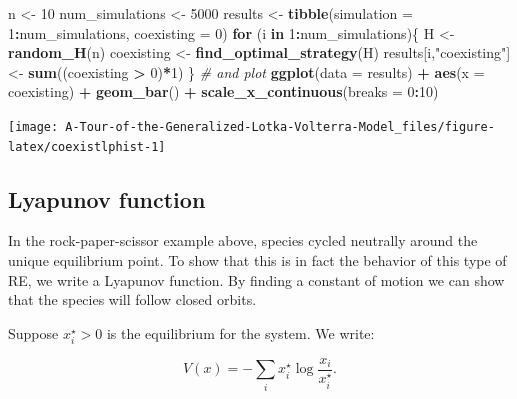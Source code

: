 \documentclass[
]{book}
\newenvironment{Shaded}{\begin{snugshade}}{\end{snugshade}}
\newcommand{\CommentTok}[1]{\textcolor[rgb]{0.56,0.35,0.01}{\textit{#1}}}
\newcommand{\ControlFlowTok}[1]{\textcolor[rgb]{0.13,0.29,0.53}{\textbf{#1}}}
\newcommand{\DataTypeTok}[1]{\textcolor[rgb]{0.13,0.29,0.53}{#1}}
\newcommand{\DecValTok}[1]{\textcolor[rgb]{0.00,0.00,0.81}{#1}}
\newcommand{\KeywordTok}[1]{\textcolor[rgb]{0.13,0.29,0.53}{\textbf{#1}}}
\newcommand{\NormalTok}[1]{#1}
\newcommand{\OperatorTok}[1]{\textcolor[rgb]{0.81,0.36,0.00}{\textbf{#1}}}
\newcommand{\StringTok}[1]{\textcolor[rgb]{0.31,0.60,0.02}{#1}}
\begin{document}
\begin{Shaded}
\begin{Highlighting}[]
\NormalTok{n <-}\StringTok{ }\DecValTok{10}
\NormalTok{num_simulations <-}\StringTok{ }\DecValTok{5000}
\NormalTok{results <-}\StringTok{ }\KeywordTok{tibble}\NormalTok{(}\DataTypeTok{simulation =} \DecValTok{1}\OperatorTok{:}\NormalTok{num_simulations, }\DataTypeTok{coexisting =} \DecValTok{0}\NormalTok{)}
\ControlFlowTok{for}\NormalTok{ (i }\ControlFlowTok{in} \DecValTok{1}\OperatorTok{:}\NormalTok{num_simulations)\{}
\NormalTok{  H <-}\StringTok{ }\KeywordTok{random_H}\NormalTok{(n)}
\NormalTok{  coexisting <-}\StringTok{ }\KeywordTok{find_optimal_strategy}\NormalTok{(H)}
\NormalTok{  results[i,}\StringTok{"coexisting"}\NormalTok{] <-}\StringTok{ }\KeywordTok{sum}\NormalTok{((coexisting }\OperatorTok{>}\StringTok{ }\DecValTok{0}\NormalTok{)}\OperatorTok{*}\DecValTok{1}\NormalTok{)}
\NormalTok{\}}
\CommentTok{# and plot}
\KeywordTok{ggplot}\NormalTok{(}\DataTypeTok{data =}\NormalTok{ results) }\OperatorTok{+}\StringTok{ }
\StringTok{  }\KeywordTok{aes}\NormalTok{(}\DataTypeTok{x =}\NormalTok{ coexisting) }\OperatorTok{+}\StringTok{ }
\StringTok{  }\KeywordTok{geom_bar}\NormalTok{() }\OperatorTok{+}\StringTok{ }
\StringTok{  }\KeywordTok{scale_x_continuous}\NormalTok{(}\DataTypeTok{breaks =} \DecValTok{0}\OperatorTok{:}\DecValTok{10}\NormalTok{)}
\end{Highlighting}
\end{Shaded}

\begin{center}\texttt{[image: A-Tour-of-the-Generalized-Lotka-Volterra-Model\_files/figure-latex/coexistlphist-1]} \end{center}

\hypertarget{lyapunov-function}{%
\subsection{Lyapunov function}\label{lyapunov-function}}

In the rock-paper-scissor example above, species cycled neutrally around the unique equilibrium point. To show that this is in fact the behavior of this type of RE, we write a Lyapunov function. By finding a constant of motion we can show that the species will follow closed orbits.

Suppose \(x_{i}^\star > 0\) is the equilibrium for the system. We write:

\[
V(x) = -\sum_i x_i^\star \log \frac{x_i}{x_i^\star} .
\]
\end{document}
